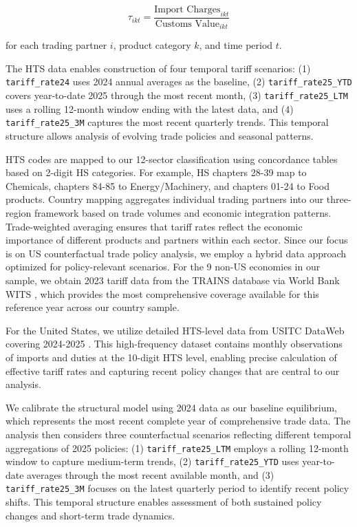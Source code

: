 \begin{equation}
\tau_{ikt} = \frac{\text{Import Charges}_{ikt}}{\text{Customs Value}_{ikt}}
\end{equation}

for each trading partner $i$, product category $k$, and time period $t$.

The HTS data enables construction of four temporal tariff scenarios: (1) \texttt{tariff\_rate24} uses 2024 annual averages as the baseline, (2) \texttt{tariff\_rate25\_YTD} covers year-to-date 2025 through the most recent month, (3) \texttt{tariff\_rate25\_LTM} uses a rolling 12-month window ending with the latest data, and (4) \texttt{tariff\_rate25\_3M} captures the most recent quarterly trends. This temporal structure allows analysis of evolving trade policies and seasonal patterns.

HTS codes are mapped to our 12-sector classification using concordance tables based on 2-digit HS categories. For example, HS chapters 28-39 map to Chemicals, chapters 84-85 to Energy/Machinery, and chapters 01-24 to Food products. Country mapping aggregates individual trading partners into our three-region framework based on trade volumes and economic integration patterns. Trade-weighted averaging ensures that tariff rates reflect the economic importance of different products and partners within each sector.
Since our focus is on US counterfactual trade policy analysis, we employ a hybrid data approach optimized for policy-relevant scenarios. For the 9 non-US economies in our sample, we obtain 2023 tariff data from the TRAINS database via World Bank WITS \citep{WorldBank_WITS}, which provides the most comprehensive coverage available for this reference year across our country sample.

For the United States, we utilize detailed HTS-level data from USITC DataWeb covering 2024-2025 \citep{USITC_DataWeb_HTS}. This high-frequency dataset contains monthly observations of imports and duties at the 10-digit HTS level, enabling precise calculation of effective tariff rates and capturing recent policy changes that are central to our analysis.

We calibrate the structural model using 2024 data as our baseline equilibrium, which represents the most recent complete year of comprehensive trade data. The analysis then considers three counterfactual scenarios reflecting different temporal aggregations of 2025 policies: (1) \texttt{tariff\_rate25\_LTM} employs a rolling 12-month window to capture medium-term trends, (2) \texttt{tariff\_rate25\_YTD} uses year-to-date averages through the most recent available month, and (3) \texttt{tariff\_rate25\_3M} focuses on the latest quarterly period to identify recent policy shifts. This temporal structure enables assessment of both sustained policy changes and short-term trade dynamics.